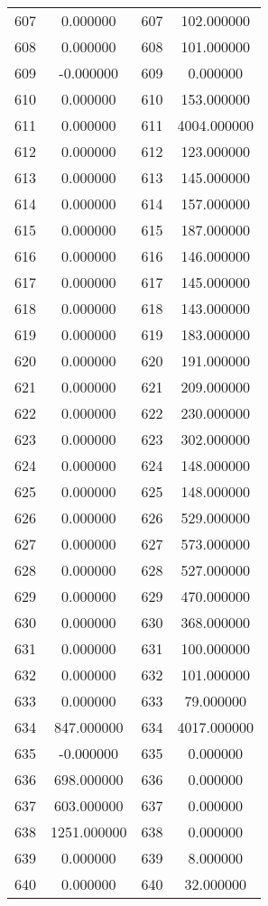 \documentclass[12pt]{article}
\begin{document}
\begin{longtable}{@{}cccc@{}}
607 & 0.000000 & 607 & 102.000000 \\
608 & 0.000000 & 608 & 101.000000 \\
609 & -0.000000 & 609 & 0.000000 \\
610 & 0.000000 & 610 & 153.000000 \\
611 & 0.000000 & 611 & 4004.000000 \\
612 & 0.000000 & 612 & 123.000000 \\
613 & 0.000000 & 613 & 145.000000 \\
614 & 0.000000 & 614 & 157.000000 \\
615 & 0.000000 & 615 & 187.000000 \\
616 & 0.000000 & 616 & 146.000000 \\
617 & 0.000000 & 617 & 145.000000 \\
618 & 0.000000 & 618 & 143.000000 \\
619 & 0.000000 & 619 & 183.000000 \\
620 & 0.000000 & 620 & 191.000000 \\
621 & 0.000000 & 621 & 209.000000 \\
622 & 0.000000 & 622 & 230.000000 \\
623 & 0.000000 & 623 & 302.000000 \\
624 & 0.000000 & 624 & 148.000000 \\
625 & 0.000000 & 625 & 148.000000 \\
626 & 0.000000 & 626 & 529.000000 \\
627 & 0.000000 & 627 & 573.000000 \\
628 & 0.000000 & 628 & 527.000000 \\
629 & 0.000000 & 629 & 470.000000 \\
630 & 0.000000 & 630 & 368.000000 \\
631 & 0.000000 & 631 & 100.000000 \\
632 & 0.000000 & 632 & 101.000000 \\
633 & 0.000000 & 633 & 79.000000 \\
634 & 847.000000 & 634 & 4017.000000 \\
635 & -0.000000 & 635 & 0.000000 \\
636 & 698.000000 & 636 & 0.000000 \\
637 & 603.000000 & 637 & 0.000000 \\
638 & 1251.000000 & 638 & 0.000000 \\
639 & 0.000000 & 639 & 8.000000 \\
640 & 0.000000 & 640 & 32.000000 \\

\end{longtable}
\end{document}
